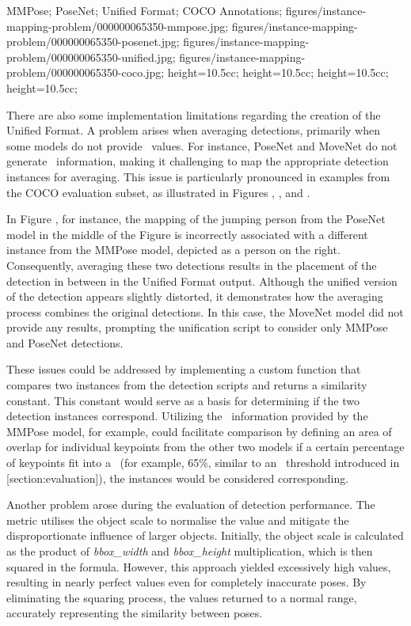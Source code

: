  {
 MMPose;
 PoseNet;
 Unified Format;
 COCO Annotations;
 }
 {
 figures/instance-mapping-problem/000000065350-mmpose.jpg;
 figures/instance-mapping-problem/000000065350-posenet.jpg;
 figures/instance-mapping-problem/000000065350-unified.jpg;
 figures/instance-mapping-problem/000000065350-coco.jpg;
 }
 {
 height=10.5cc;
 height=10.5cc;
 height=10.5cc;
 height=10.5cc;
 }

There are also some implementation limitations regarding the creation of the Unified Format. A problem arises when averaging detections, primarily when some models do not provide \BBOX\ values. For instance, PoseNet and MoveNet do not generate \BBOX\ information, making it challenging to map the appropriate detection instances for averaging. This issue is particularly pronounced in examples from the COCO evaluation subset, as illustrated in Figures , , and .

In Figure , for instance, the mapping of the jumping person from the PoseNet model in the middle of the Figure is incorrectly associated with a different instance from the MMPose model, depicted as a person on the right. Consequently, averaging these two detections results in the placement of the detection in between in the Unified Format output. Although the unified version of the detection appears slightly distorted, it demonstrates how the averaging process combines the original detections. In this case, the MoveNet model did not provide any results, prompting the unification script to consider only MMPose and PoseNet detections.

These issues could be addressed by implementing a custom function that compares two instances from the detection scripts and returns a similarity constant. This constant would serve as a basis for determining if the two detection instances correspond. Utilizing the \BBOX\ information provided by the MMPose model, for example, could facilitate comparison by defining an area of overlap for individual keypoints from the other two models if a certain percentage of keypoints fit into a \BBOX\ (for example, 65\%, similar to an \IoU\ threshold introduced in [section:evaluation]), the instances would be considered corresponding.

Another problem arose during the evaluation of detection performance. The \pojem{\OKS} metric utilises the object scale to normalise the value and mitigate the disproportionate influence of larger objects. Initially, the object scale is calculated as the product of {\it bbox_width} and {\it bbox_height} multiplication, which is then squared in the \pojem{\OKS} formula. However, this approach yielded excessively high values, resulting in nearly perfect \pojem{\OKS} values even for completely inaccurate poses. By eliminating the squaring process, the \pojem{\OKS} values returned to a normal range, accurately representing the similarity between poses.


